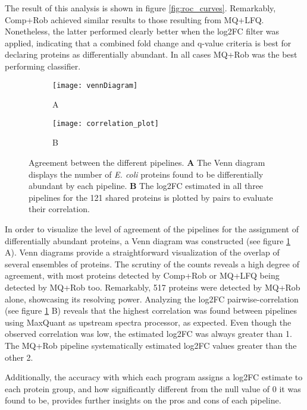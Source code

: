 The result of this analysis is shown in figure \ref{fig:roc_curves}. Remarkably, Comp+Rob achieved similar results to those resulting from MQ+LFQ. Nonetheless, the latter performed clearly better when the \ac{log2FC} filter was applied, indicating that a combined fold change and q-value criteria is best for declaring proteins as differentially abundant. In all cases MQ+Rob was the best performing classifier.

\begin{figure}[H]
\centering
\begin{subfigure}{.40\textwidth}
\caption*{A}
\texttt{[image: vennDiagram]}
\end{subfigure}
\begin{subfigure}{.52\textwidth}
\caption*{B}
\texttt{[image: correlation\_plot]}
\end{subfigure}
\caption[Pipeline agreement plots]{Agreement between the different pipelines. \textbf{A} The Venn diagram displays the number of \textit{E. coli} proteins found to be differentially abundant by each pipeline. \textbf{B} The \ac{log2FC} estimated in all three pipelines for the 121 shared proteins is plotted by pairs to evaluate their correlation.}
\label{fig:venn_cor}
\end{figure}


In order to visualize the level of agreement of the pipelines for the assignment of differentially abundant proteins, a Venn diagram was constructed (see figure \ref{fig:venn_cor} A). Venn diagrams provide a straightforward visualization of the overlap of several ensembles of proteins. The scrutiny of the counts reveals a high degree of agreement, with most proteins detected by Comp+Rob or MQ+LFQ being detected by MQ+Rob too. Remarkably, 517 proteins were detected by MQ+Rob alone, showcasing its resolving power. Analyzing the log2FC pairwise-correlation (see figure \ref{fig:venn_cor} B) reveals that the highest correlation was found between pipelines using MaxQuant as upstream spectra processor, as expected. Even though the observed correlation was low, the estimated log2FC was always greater than 1. The MQ+Rob pipeline systematically estimated \ac{log2FC} values greater than the other 2.


Additionally, the accuracy with which each program assigns a \ac{log2FC} estimate to each protein group, and how significantly different from the null value of 0 it was found to be, provides further insights on the pros and cons of each pipeline.

